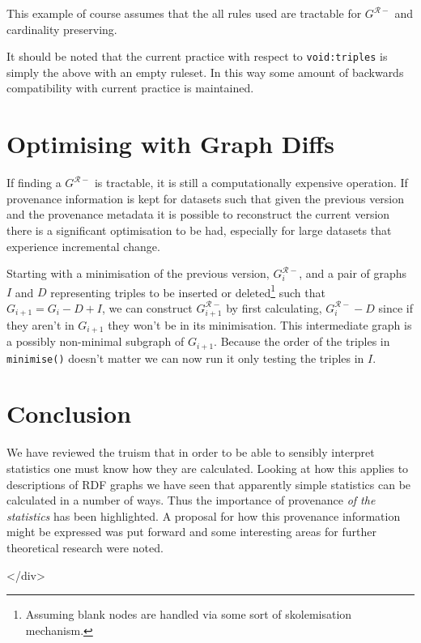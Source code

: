 \documentclass{article}
\begin{document}
This example of course assumes that the all rules used are
tractable for $G^{\mathcal{R}-}$ and cardinality preserving.

It should be noted that the current practice with respect to
\texttt{void:triples} is simply the above with an empty
ruleset. In this way some amount of backwards compatibility
with current practice is maintained.

\section{Optimising with Graph Diffs}

If finding a $G^{{\mathcal R}-}$ is tractable, it is still a
computationally expensive operation. If provenance information is
kept for datasets such that given the previous version and the
provenance metadata it is possible to reconstruct the current
version there is a significant optimisation to be had, especially
for large datasets that experience incremental change.

Starting with a minimisation of the previous version,
$G^{{\mathcal R}-}_i$, and a pair of graphs $I$ and $D$
representing triples to be inserted or deleted\footnote{
  Assuming blank nodes are handled via some sort of 
  skolemisation mechanism.
} such that $G_{i+1} = G_i - D + I$, we can construct
$G^{{\mathcal R}-}_{i+1}$ by first calculating,
$G^{{\mathcal R}-}_i - D$ since if they aren't in $G_{i+1}$
they won't be in its minimisation. This intermediate 
graph is a possibly non-minimal subgraph of $G_{i+1}$.
Because the order of the triples in \texttt{minimise()}
doesn't matter we can now run it only testing the triples
in $I$.

\section{Conclusion}

We have reviewed the truism that in order to be able
to sensibly interpret statistics one must know how they
are calculated. Looking at how this applies to descriptions
of RDF graphs we have seen that apparently simple statistics
can be calculated in a number of ways. Thus the importance
of provenance {\em of the statistics} has been highlighted.
A proposal for how this provenance information might be
expressed was put forward and some interesting areas for
further theoretical research were noted.



\begin{htmlonly}
  \begin{rawhtml}
    </div>
  \end{rawhtml}
\end{htmlonly}
\end{document}
